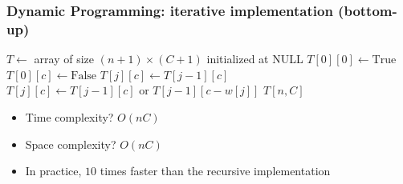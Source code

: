 \documentclass{beamer}
\begin{document}
\begin{frame}
  \frametitle{Dynamic Programming: iterative implementation (bottom-up)}

  \begin{algorithmic}
    \State$T \gets$ array of size $(n + 1) \times (C + 1)$ initialized at NULL
    \State$T[0][0] \gets \text{True}$
    \State$T[0][c] \gets \text{False}$
    \EndFor
    \State$T[j][c] \gets T[j - 1][c]$
    \EndFor
    \State$T[j][c] \gets T[j - 1][c] \text{ or } T[j - 1][c - w[j]]$
    \EndFor
    \EndFor
    \State\Return{}$T[n, C]$
    \EndProcedure{}
  \end{algorithmic}

  \begin{itemize}
    \item \pause Time complexity? \pause $O(nC)$
    \item \pause Space complexity? \pause $O(nC)$
    \item \pause In practice, $10$ times faster than the recursive implementation
  \end{itemize}

\end{frame}
\end{document}
